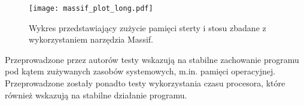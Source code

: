 \begin{figure}[H]
    \centering
    \texttt{[image: massif\_plot\_long.pdf]}
    \caption{Wykres przedstawiający zużycie pamięci sterty i stosu zbadane z wykorzystaniem narzędzia Massif.}
    \label{fig:massif-long}
\end{figure}

Przeprowadzone przez autorów testy wskazują na stabilne zachowanie programu pod kątem zużywanych zasobów systemowych, m.in. pamięci operacyjnej. Przeprowadzone zostały ponadto testy wykorzystania czasu procesora, które również wskazują na stabilne działanie programu.
